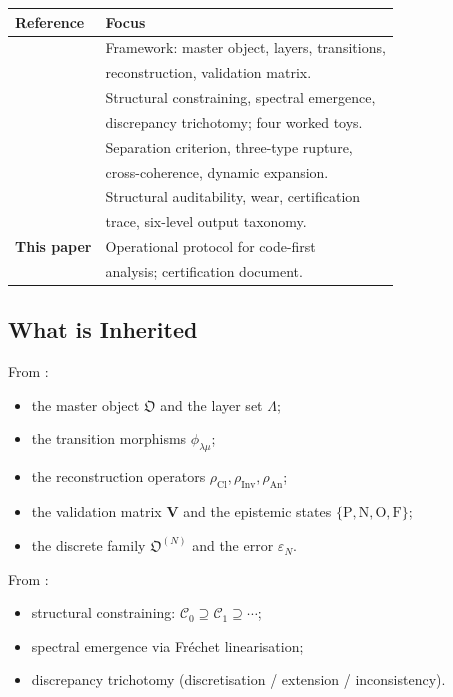 \documentclass[11pt,a4paper]{article}
\theoremstyle{definition}
\theoremstyle{plain}
\newcommand{\Lam}{\Lambda}
\newcommand{\Cl}{\mathrm{Cl}}
\newcommand{\Inv}{\mathrm{Inv}}
\newcommand{\An}{\mathrm{An}}
\newcommand{\Ob}{\mathfrak{O}}
\newcommand{\Ccal}{\mathcal{C}}
\newcommand{\philam}{\phi_{\lambda\mu}}
\newcommand{\Vmat}{\mathbf{V}}
\newcommand{\Pmark}{\mathrm{P}}
\newcommand{\Nmark}{\mathrm{N}}
\newcommand{\Omark}{\mathrm{O}}
\newcommand{\Fmark}{\mathrm{F}}
\begin{document}
\begin{center}
\begin{tabular}{l l}
  \toprule
  Reference & Focus \\
  \midrule
  \cite{framework} & Framework: master object, layers, transitions, \\
                   & reconstruction, validation matrix. \\
  \cite{paperI}    & Structural constraining, spectral emergence, \\
                   & discrepancy trichotomy; four worked toys. \\
  \cite{paperII}   & Separation criterion, three-type rupture, \\
                   & cross-coherence, dynamic expansion. \\
  \cite{paperIII}  & Structural auditability, wear, certification \\
                   & trace, six-level output taxonomy. \\
  \textbf{This paper} & Operational protocol for code-first \\
                   & analysis; certification document. \\
  \bottomrule
\end{tabular}
\end{center}

\subsection{What is Inherited}

From \cite{framework}:
\begin{itemize}
  \item the master object $\Ob$ and the layer set $\Lam$;
  \item the transition morphisms $\philam$;
  \item the reconstruction operators $\rho_\Cl, \rho_\Inv, \rho_\An$;
  \item the validation matrix $\Vmat$ and the epistemic states
        $\{\Pmark, \Nmark, \Omark, \Fmark\}$;
  \item the discrete family $\Ob^{(N)}$ and the error
        $\varepsilon_N$.
\end{itemize}

From \cite{paperI}:
\begin{itemize}
  \item structural constraining: $\Ccal_0 \supseteq \Ccal_1
        \supseteq \cdots$;
  \item spectral emergence via Fr\'echet linearisation;
  \item discrepancy trichotomy (discretisation / extension /
        inconsistency).
\end{itemize}
\end{document}
